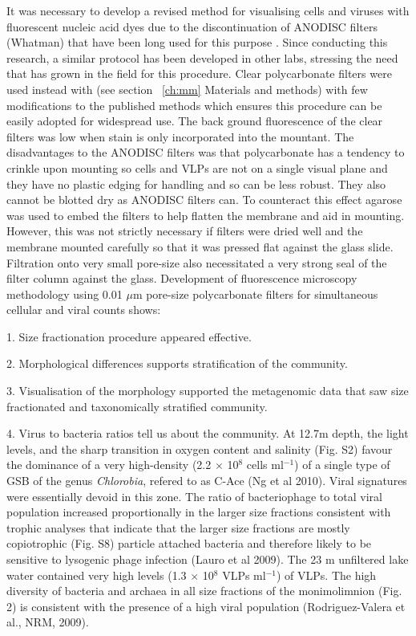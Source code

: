 It was necessary to develop a revised method for visualising cells and viruses with fluorescent nucleic acid dyes due to the discontinuation of ANODISC filters (Whatman) that have been long used for this purpose \cite{Hennes1995, Noble1998}. %
Since conducting this research, a similar protocol has been developed in other labs, stressing the need that has grown in the field for this procedure. %
Clear polycarbonate filters were used instead with (see section ~\ref{ch:mm} Materials and methods) with few modifications to the published methods which ensures this procedure can be easily adopted for widespread use.
The back ground fluorescence of the clear filters was low when stain is only incorporated into the mountant.
The disadvantages to the ANODISC filters was that polycarbonate has a tendency to crinkle upon mounting so cells and \acp{VLP} are not on a single visual plane and they have no plastic edging for handling and so can be less robust.
They also cannot be blotted dry as ANODISC filters can.
To counteract this effect agarose was used to embed the filters to help flatten the membrane and aid in mounting.
However, this was not strictly necessary if filters were dried well and the membrane mounted carefully so that it was pressed flat against the glass slide.
Filtration onto very small pore-size also necessitated a very strong seal of the filter column against the glass.
Development of fluorescence microscopy methodology using 0.01 $\mu$m pore-size polycarbonate filters for simultaneous cellular and viral counts shows:

1. Size fractionation procedure appeared effective.

2. Morphological differences supports stratification of the community.

3. Visualisation of the morphology supported the metagenomic data that saw size fractionated and taxonomically stratified community.

4. Virus to bacteria ratios tell us about the community.
At 12.7m depth, the light levels, and the sharp transition in oxygen content and salinity (Fig. S2) favour the dominance of a very high-density (2.2 $\times$ 10$^8$ cells ml$^{-1}$) of a single type of \ac{GSB} of the genus \emph{Chlorobia}, refered to as C-Ace (Ng et al 2010). 
Viral signatures were essentially devoid in this zone. 
The ratio of bacteriophage to total viral population increased proportionally in the larger size fractions consistent with trophic analyses that indicate that the larger size fractions are mostly copiotrophic (Fig. S8) particle attached bacteria and therefore likely to be sensitive to lysogenic phage infection (Lauro et al 2009). 
The 23 m unfiltered lake water contained very high levels (1.3 $\times$ 10$^8$ \acp{VLP} ml$^{-1}$) of \acp{VLP}. 
The high diversity of bacteria and archaea in all size fractions of the monimolimnion (Fig. 2) is consistent with the presence of a high viral population (Rodriguez-Valera et al., NRM, 2009).

